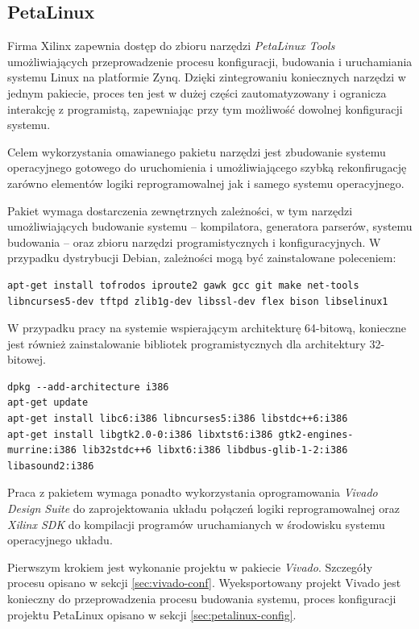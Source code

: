 \subsection{PetaLinux} %

Firma Xilinx zapewnia dostęp do zbioru narzędzi \emph{PetaLinux Tools} \cite{petalinux-tools} umożliwiających przeprowadzenie procesu konfiguracji, budowania i uruchamiania systemu Linux na platformie Zynq. 
Dzięki zintegrowaniu koniecznych narzędzi w jednym pakiecie, proces ten jest w dużej części zautomatyzowany i ogranicza interakcję z programistą, zapewniając przy tym możliwość dowolnej konfiguracji systemu.

Celem wykorzystania omawianego pakietu narzędzi jest zbudowanie systemu operacyjnego gotowego do uruchomienia i umożliwiającego szybką rekonfirugację zarówno elementów logiki reprogramowalnej jak i samego systemu operacyjnego.

Pakiet wymaga dostarczenia zewnętrznych zależności, w tym narzędzi umożliwiających budowanie systemu -- kompilatora, generatora parserów, systemu budowania -- oraz zbioru narzędzi programistycznych i konfiguracyjnych.
W przypadku dystrybucji Debian, zależności mogą być zainstalowane poleceniem:

\begin{lstlisting}[breaklines=true]
apt-get install tofrodos iproute2 gawk gcc git make net-tools libncurses5-dev tftpd zlib1g-dev libssl-dev flex bison libselinux1
\end{lstlisting}

W przypadku pracy na systemie wspierającym architekturę 64-bitową, konieczne jest również zainstalowanie bibliotek programistycznych dla architektury 32-bitowej.

\begin{lstlisting}[breaklines=true]
dpkg --add-architecture i386
apt-get update
apt-get install libc6:i386 libncurses5:i386 libstdc++6:i386
apt-get install libgtk2.0-0:i386 libxtst6:i386 gtk2-engines-murrine:i386 lib32stdc++6 libxt6:i386 libdbus-glib-1-2:i386 libasound2:i386
\end{lstlisting}

Praca z pakietem wymaga ponadto wykorzystania oprogramowania \emph{Vivado Design Suite} \cite{vivado-home} do zaprojektowania układu połączeń logiki reprogramowalnej oraz \emph{Xilinx SDK} \cite{xsdk-home} do kompilacji programów uruchamianych w środowisku systemu operacyjnego układu.

Pierwszym krokiem jest wykonanie projektu w pakiecie \emph{Vivado}. 
Szczegóły procesu opisano w sekcji \ref{sec:vivado-conf}. %
Wyeksportowany projekt Vivado jest konieczny do przeprowadzenia procesu budowania systemu, proces konfiguracji projektu PetaLinux opisano w sekcji \ref{sec:petalinux-config}. %

